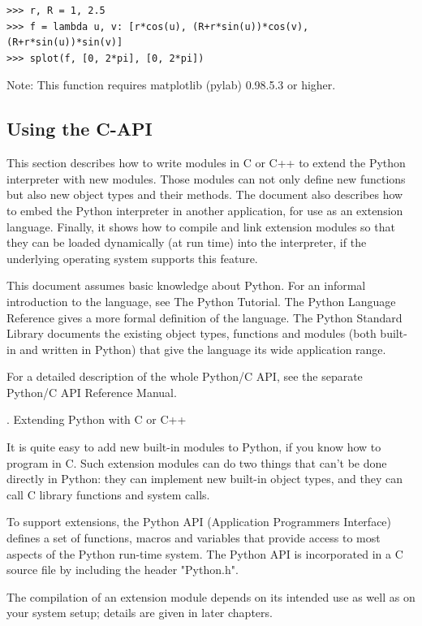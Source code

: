 \begin{lstlisting}
>>> r, R = 1, 2.5
>>> f = lambda u, v: [r*cos(u), (R+r*sin(u))*cos(v), (R+r*sin(u))*sin(v)]
>>> splot(f, [0, 2*pi], [0, 2*pi])
\end{lstlisting}


Note: This function requires matplotlib (pylab) 0.98.5.3 or higher.


\subsection{Using the C-API}

This section describes how to write modules in C or C++ to extend the Python interpreter with new modules. Those modules can not only define new functions but also new object types and their methods. The document also describes how to embed the Python interpreter in another application, for use as an extension language. Finally, it shows how to compile and link extension modules so that they can be loaded dynamically (at run time) into the interpreter, if the underlying operating system supports this feature.

This document assumes basic knowledge about Python. For an informal introduction to the language, see The Python Tutorial. The Python Language Reference gives a more formal definition of the language. The Python Standard Library documents the existing object types, functions and modules (both built-in and written in Python) that give the language its wide application range.

For a detailed description of the whole Python/C API, see the separate Python/C API Reference Manual.

. Extending Python with C or C++

It is quite easy to add new built-in modules to Python, if you know how to program in C. Such extension modules can do two things that can’t be done directly in Python: they can implement new built-in object types, and they can call C library functions and system calls.

To support extensions, the Python API (Application Programmers Interface) defines a set of functions, macros and variables that provide access to most aspects of the Python run-time system. The Python API is incorporated in a C source file by including the header "Python.h".

The compilation of an extension module depends on its intended use as well as on your system setup; details are given in later chapters.

